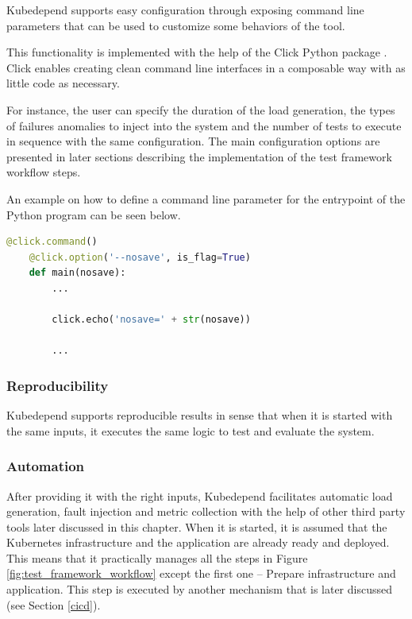 Kubedepend supports easy configuration through exposing command line parameters that can be used to customize some behaviors of the tool.

This functionality is implemented with the help of the Click Python package \cite{Click}. Click enables creating clean command line interfaces in a composable way with as little code as necessary.

For instance, the user can specify the duration of the load generation, the types of failures anomalies to inject into the system and the number of tests to execute in sequence with the same configuration. The main configuration options are presented in later sections describing the implementation of the test framework workflow steps.

An example on how to define a command line parameter for the entrypoint of the Python program can be seen below.

\vspace{0.5cm}
\begin{minipage}{\linewidth}
	\begin{lstlisting}[language=python, caption={Define a parameter to control saving test results (simplified extract)}, label={lst:click-option}]
	@click.command()
	@click.option('--nosave', is_flag=True)
	def main(nosave):
		...
	
		click.echo('nosave=' + str(nosave))
		
		...\end{lstlisting}
\end{minipage}

\subsubsection{Reproducibility}

Kubedepend supports reproducible results in sense that when it is started with the same inputs, it executes the same logic to test and evaluate the system. 

\subsubsection{Automation}

After providing it with the right inputs, Kubedepend facilitates automatic load generation, fault injection and metric collection with the help of other third party tools later discussed in this chapter. When it is started, it is assumed that the Kubernetes infrastructure and the application are already ready and deployed. This means that it practically manages all the steps in Figure \ref{fig:test_framework_workflow} except the first one -- Prepare infrastructure and application. This step is executed by another mechanism that is later discussed (see Section \ref{cicd}).

